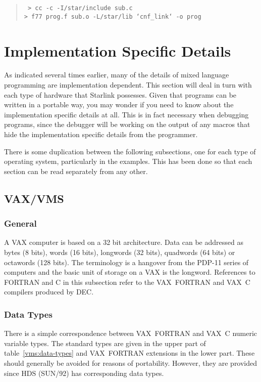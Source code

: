 \begin{quote}{\tt
> cc -c -I/star/include sub.c \\
> f77 prog.f sub.o -L/star/lib `cnf\_link` -o prog
}
\end{quote}



\appendix
\newpage

\section{Implementation Specific Details}
\label{implement}

As indicated several times earlier, many of the details of mixed language
programming are implementation dependent. This section will deal in turn with
each type of hardware that Starlink possesses. Given that programs can be
written in a portable way, you may wonder if you need to know about the
implementation specific details at all. This is in fact necessary when
debugging programs, since the debugger will be working on the output of any
macros that hide the implementation specific details from the programmer.

There is some duplication between the following subsections, one for each type
of operating system, particularly in the examples. This has been done so that
each section can be read separately from any other.

\subsection{VAX/VMS}

\subsubsection{General}

A VAX computer is based on a 32 bit architecture. Data can be addressed as
bytes (8 bits), words (16 bits), longwords (32 bits), quadwords (64 bits) or
octawords (128 bits). The terminology is a hangover from the PDP-11 series of
computers and the basic unit of storage on a VAX is the longword. References to
FORTRAN and C in this subsection refer to the VAX~FORTRAN and VAX~C compilers
produced by DEC.

\subsubsection{Data Types}

There is a simple correspondence between VAX~FORTRAN and VAX~C numeric variable
types. The standard types are given in the upper part of
table~\ref{vms:data-types} and VAX~FORTRAN extensions in the lower part. These
should generally be avoided for reasons of portability. However, they are
provided since HDS (SUN/92) has corresponding data types.

